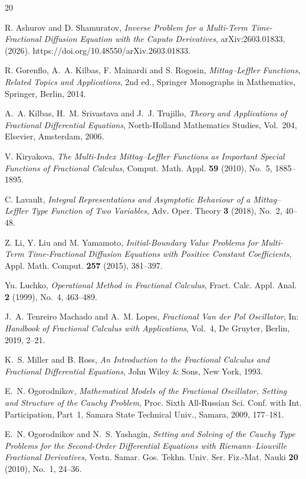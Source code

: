 \documentclass[12pt, reqno]{amsart}
\theoremstyle{definition}
\theoremstyle{remark}
\numberwithin{equation}{section}
\begin{document}
\begin{thebibliography}{20}

{\sc R. Ashurov and D. Shamuratov},
{\it Inverse Problem for a Multi-Term Time-Fractional Diffusion Equation with the Caputo Derivatives},
arXiv:2603.01833, (2026).
https://doi.org/10.48550/arXiv.2603.01833.

{\sc R. Gorenflo, A.~A. Kilbas, F. Mainardi and S. Rogosin},
{\it Mittag--Leffler Functions, Related Topics and Applications},
2nd ed.,
Springer Monographs in Mathematics,
Springer, Berlin, 2014.

{\sc A.~A. Kilbas, H.~M. Srivastava and J.~J. Trujillo},
{\it Theory and Applications of Fractional Differential Equations},
North-Holland Mathematics Studies, Vol.~204,
Elsevier, Amsterdam, 2006.

{\sc V. Kiryakova},
{\it The Multi-Index Mittag--Leffler Functions as Important Special Functions of Fractional Calculus},
Comput. Math. Appl.
{\bf 59} (2010), No.~5, 1885--1895.

{\sc C. Lavault},
{\it Integral Representations and Asymptotic Behaviour of a Mittag--Leffler Type Function of Two Variables},
Adv. Oper. Theory
{\bf 3} (2018), No.~2, 40--48.

{\sc Z. Li, Y. Liu and M. Yamamoto},
{\it Initial-Boundary Value Problems for Multi-Term Time-Fractional Diffusion Equations with Positive Constant Coefficients},
Appl. Math. Comput.
{\bf 257} (2015), 381--397.

{\sc Yu. Luchko},
{\it Operational Method in Fractional Calculus},
Fract. Calc. Appl. Anal.
{\bf 2} (1999), No.~4, 463--489.

{\sc J.~A. Tenreiro Machado and A.~M. Lopes},
{\it Fractional Van der Pol Oscillator},
In:
{\it Handbook of Fractional Calculus with Applications},
Vol.~4,
De Gruyter, Berlin, 2019, 2--21.

{\sc K.~S. Miller and B. Ross},
{\it An Introduction to the Fractional Calculus and Fractional Differential Equations},
John Wiley \& Sons,
New York, 1993.

{\sc E.~N. Ogorodnikov},
{\it Mathematical Models of the Fractional Oscillator, Setting and Structure of the Cauchy Problem},
Proc. Sixth All-Russian Sci. Conf. with Int. Participation,
Part~1,
Samara State Technical Univ.,
Samara, 2009, 177--181.

{\sc E.~N. Ogorodnikov and N.~S. Yashagin},
{\it Setting and Solving of the Cauchy Type Problems for the Second-Order Differential Equations with Riemann--Liouville Fractional Derivatives},
Vestn. Samar. Gos. Tekhn. Univ. Ser. Fiz.-Mat. Nauki
{\bf 20} (2010), No.~1, 24--36.


\end{thebibliography}
\end{document}
